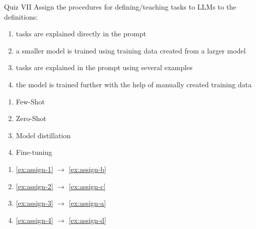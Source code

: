 \documentclass{article}
\begin{document}
\begin{exercise}{Quiz VII}
  Assign the procedures for defining/teaching tasks to LLMs to the definitions:
  \begin{enumerate}
    \item\label{ex:assign-1} tasks are explained directly in the prompt
    \item\label{ex:assign-2}  a smaller model is trained using training data created from a larger model
    \item\label{ex:assign-3}  tasks are explained in the prompt using several examples
    \item\label{ex:assign-4}  the model is trained further with the help of manually created training data
  \end{enumerate}
  \begin{enumerate}
    \item\label{ex:assign-a}  Few-Shot
    \item\label{ex:assign-b}  Zero-Shot
    \item\label{ex:assign-c}  Model distillation
    \item\label{ex:assign-d}  Fine-tuning
  \end{enumerate}

  \begin{solution}
    \begin{enumerate}
      \item\ref{ex:assign-1} $\to$ \ref{ex:assign-b}
      \item\ref{ex:assign-2} $\to$ \ref{ex:assign-c}
      \item\ref{ex:assign-3} $\to$ \ref{ex:assign-a}
      \item\ref{ex:assign-4} $\to$ \ref{ex:assign-d}
    \end{enumerate}
  \end{solution}
\end{exercise}
\end{document}
